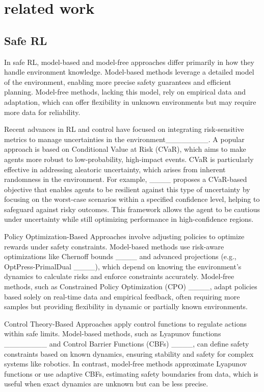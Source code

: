 \section{related work}
\subsection{Safe RL}

In safe RL, model-based and model-free approaches differ primarily in how they handle environment knowledge. Model-based methods leverage a detailed model of the environment, enabling more precise safety guarantees and efficient planning. Model-free methods, lacking this model, rely on empirical data and adaptation, which can offer flexibility in unknown environments but may require more data for reliability. 

Recent advances in RL and control have focused on integrating risk-sensitive metrics to manage uncertainties in the environment________. A popular approach is based on Conditional Value at Risk (CVaR), which aims to make agents more robust to low-probability, high-impact events. CVaR is particularly effective in addressing aleatoric uncertainty, which arises from inherent randomness in the environment. For example, ____ proposes a CVaR-based objective that enables agents to be resilient against this type of uncertainty by focusing on the worst-case scenarios within a specified confidence level, helping to safeguard against risky outcomes. This framework allows the agent to be cautious under uncertainty while still optimizing performance in high-confidence regions.

Policy Optimization-Based Approaches involve adjusting policies to optimize rewards under safety constraints. Model-based methods use risk-aware optimizations like Chernoff bounds ____ and advanced projections (e.g., OptPress-PrimalDual ____), which depend on knowing the environment’s dynamics to calculate risks and enforce constraints accurately. Model-free methods, such as Constrained Policy Optimization (CPO) ____, adapt policies based solely on real-time data and empirical feedback, often requiring more samples but providing flexibility in dynamic or partially known environments.

Control Theory-Based Approaches apply control functions to regulate actions within safe limits. Model-based methods, such as Lyapunov functions ________ and Control Barrier Functions (CBFs) ____, can define safety constraints based on known dynamics, ensuring stability and safety for complex systems like robotics. In contrast, model-free methods approximate Lyapunov functions or use adaptive CBFs, estimating safety boundaries from data, which is useful when exact dynamics are unknown but can be less precise.


